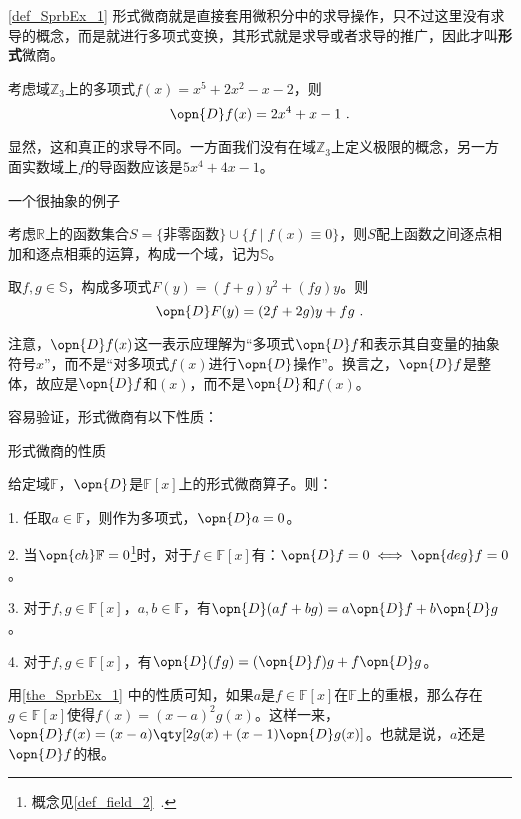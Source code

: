 \autoref{def_SprbEx_1} 形式微商就是直接套用微积分中的求导操作，只不过这里没有求导的概念，而是就进行多项式变换，其形式就是求导或者求导的推广，因此才叫\textbf{形式}微商。

\begin{example}{}
考虑域$\mathbb{Z}_3$上的多项式$f(x)=x^5+2x^2-x-2$，则
\begin{equation}
\opn{D}f(x) = 2x^4+x-1~.
\end{equation}

显然，这和真正的求导不同。一方面我们没有在域$\mathbb{Z}_3$上定义极限的概念，另一方面实数域上$f$的导函数应该是$5x^4+4x-1$。
\end{example}

\begin{example}{一个很抽象的例子}

考虑$\mathbb{R}$上的函数集合$S=\{\text{非零函数}\}\cup\{f\mid f(x)\equiv 0\}$，则$S$配上函数之间逐点相加和逐点相乘的运算，构成一个域，记为$\mathbb{S}$。

取$f, g\in\mathbb{S}$，构成多项式$F(y)=(f+g)y^2+(fg)y$。则
\begin{equation}
\opn{D}F(y) = (2f+2g)y+fg~.
\end{equation}

\end{example}

注意，$\opn{D}f(x)$这一表示应理解为“多项式$\opn{D}f$和表示其自变量的抽象符号$x$”，而不是“对多项式$f(x)$进行$\opn{D}$操作”。换言之，$\opn{D}f$是整体，故应是$\opn{D}f$和$(x)$，而不是$\opn{D}$和$f(x)$。

容易验证，形式微商有以下性质：

\begin{theorem}{形式微商的性质}\label{the_SprbEx_1}

给定域$\mathbb{F}$，$\opn{D}$是$\mathbb{F}[x]$上的形式微商算子。则：

1. 任取$a\in\mathbb{F}$，则作为多项式，$\opn{D}a=0$。

2. 当$\opn{ch}\mathbb{F}=0$\footnote{概念见\autoref{def_field_2}~. }时，对于$f\in\mathbb{F}[x]$有：$\opn{D}f=0 \iff \opn{deg}f=0$。

3. 对于$f, g\in\mathbb{F}[x]$，$a, b\in\mathbb{F}$，有$\opn{D}(af+bg)=a\opn{D}f+b\opn{D}g$。

4. 对于$f, g\in\mathbb{F}[x]$，有$\opn{D}(fg) = (\opn{D}f)g+f\opn{D}g$。

\end{theorem}

用\autoref{the_SprbEx_1} 中的性质可知，如果$a$是$f\in\mathbb{F}[x]$在$\mathbb{F}$上的重根，那么存在$g\in\mathbb{F}[x]$使得$f(x)=(x-a)^2g(x)$。这样一来，$\opn{D}f(x)=(x-a)\qty[2g(x)+(x-1)\opn{D}g(x)]$。也就是说，$a$还是$\opn{D}f$的根。

